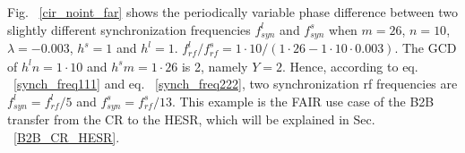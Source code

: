 Fig. ~\ref{cir_noint_far} shows the periodically variable phase difference between two slightly different synchronization frequencies $f_{\mathit{syn}}^{l}$ and $f_{\mathit{syn}}^{s}$ when $m=26$, $n=10$, $\lambda=-0.003$, $h^s=1$ and $h^l=1$. $f_{\mathit{rf}}^{l}/f_{\mathit{rf}}^{s}=1\cdot 10/(1\cdot26-1\cdot10\cdot0.003)$. The GCD of $h^ln=1\cdot10$ and $h^s m=1\cdot26$ is 2, namely $Y=2$. Hence, according to eq. ~\ref{synch_freq111} and eq. ~\ref{synch_freq222}, two synchronization rf frequencies are $f_{\mathit{syn}}^{l}=f_{\mathit{rf}}^{l}/5$ and $f_{\mathit{syn}}^{s}=f_{\mathit{rf}}^{s}/13$. This example is the FAIR use case of the B2B transfer from the CR to the HESR, which will be explained in Sec. ~\ref{B2B_CR_HESR}.   



